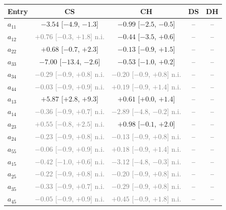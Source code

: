 \begin{tabular}{lcccc}\toprule
Entry & CS & CH & DS & DH\\
\midrule
$a_{11}$ & $-3.54$ [$-4.9$, $-1.3$] & $-0.99$ [$-2.5$, $-0.5$] & -- & --\\
$a_{12}$ & \textcolor{gray}{$+0.76$ [$-0.3$, $+1.8$] n.i.} & $-0.44$ [$-3.5$, $+0.6$] & -- & --\\
$a_{22}$ & $+0.68$ [$-0.7$, $+2.3$] & $-0.13$ [$-0.9$, $+1.5$] & -- & --\\
$a_{33}$ & $-7.00$ [$-13.4$, $-2.6$] & $-0.53$ [$-1.0$, $+0.2$] & -- & --\\
$a_{34}$ & \textcolor{gray}{$-0.29$ [$-0.9$, $+0.8$] n.i.} & \textcolor{gray}{$-0.20$ [$-0.9$, $+0.8$] n.i.} & -- & --\\
$a_{44}$ & \textcolor{gray}{$-0.03$ [$-0.9$, $+0.9$] n.i.} & \textcolor{gray}{$+0.19$ [$-0.9$, $+1.4$] n.i.} & -- & --\\
$a_{13}$ & $+5.87$ [$+2.8$, $+9.3$] & $+0.61$ [$+0.0$, $+1.4$] & -- & --\\
$a_{14}$ & \textcolor{gray}{$-0.36$ [$-0.9$, $+0.7$] n.i.} & \textcolor{gray}{$-2.89$ [$-4.8$, $-0.2$] n.i.} & -- & --\\
$a_{23}$ & \textcolor{gray}{$+0.55$ [$-0.8$, $+2.5$] n.i.} & $+0.98$ [$-0.1$, $+2.0$] & -- & --\\
$a_{24}$ & \textcolor{gray}{$-0.23$ [$-0.9$, $+0.8$] n.i.} & \textcolor{gray}{$-0.13$ [$-0.9$, $+0.8$] n.i.} & -- & --\\
$a_{55}$ & \textcolor{gray}{$-0.06$ [$-0.9$, $+0.9$] n.i.} & \textcolor{gray}{$+0.18$ [$-0.9$, $+1.4$] n.i.} & -- & --\\
$a_{15}$ & \textcolor{gray}{$-0.42$ [$-1.0$, $+0.6$] n.i.} & \textcolor{gray}{$-3.12$ [$-4.8$, $-0.3$] n.i.} & -- & --\\
$a_{25}$ & \textcolor{gray}{$-0.22$ [$-0.9$, $+0.8$] n.i.} & \textcolor{gray}{$-0.20$ [$-0.9$, $+0.8$] n.i.} & -- & --\\
$a_{35}$ & \textcolor{gray}{$-0.33$ [$-0.9$, $+0.7$] n.i.} & \textcolor{gray}{$-0.29$ [$-0.9$, $+0.8$] n.i.} & -- & --\\
$a_{45}$ & \textcolor{gray}{$-0.05$ [$-0.9$, $+0.9$] n.i.} & \textcolor{gray}{$+0.45$ [$-0.9$, $+1.8$] n.i.} & -- & --\\
\bottomrule\end{tabular}
